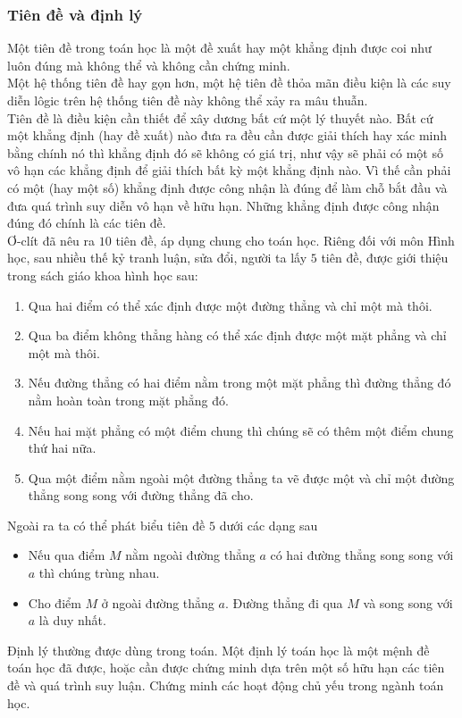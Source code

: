 \subsubsection{Tiên đề và định lý}
Một tiên đề trong toán học là một đề xuất hay một khẳng  định được coi như luôn đúng mà không thể  và không cần chứng minh.\\
Một hệ thống tiên đề hay gọn hơn, một hệ tiên đề thỏa mãn điều kiện là các suy diễn lôgic trên hệ thống tiên đề này không thể xảy ra mâu thuẫn.\\
Tiên đề là điều kiện cần thiết để xây dương bất cứ một lý thuyết nào. Bất cứ một khẳng định (hay đề xuất) nào đưa ra  đều cần được giải thích hay xác minh bằng chính nó thì khẳng định đó sẽ không có giá trị, như vậy sẽ phải có một số vô hạn các khẳng định để giải thích bất kỳ một khẳng định nào. Vì thế  cần phải có một (hay một số) khẳng định được công nhận là đúng để làm chỗ bắt đầu  và đưa quá trình suy diễn vô hạn về hữu hạn. Những khẳng định được công nhận đúng đó chính là các tiên đề.\\
Ơ-clít đã nêu ra $10$ tiên đề, áp dụng chung cho toán học. Riêng đối với môn Hình học, sau nhiều thế kỷ tranh luận, sửa đổi, người ta lấy $5$ tiên đề, được giới thiệu trong sách giáo khoa hình học sau:
	\begin{enumerate}[1.]
	\item Qua hai điểm có thể xác định được một đường thẳng và chỉ một mà thôi.
	\item Qua ba điểm không thẳng hàng có thể xác định được một mặt phẳng và chỉ một mà thôi.
	\item Nếu  đường thẳng có hai điểm nằm trong một mặt phẳng thì đường thẳng đó nằm hoàn toàn trong mặt phẳng đó.
	\item Nếu hai mặt phẳng có một điểm chung thì chúng sẽ có thêm một điểm chung thứ hai nữa.
	\item Qua một điểm nằm ngoài một đường thẳng ta vẽ  được một và chỉ một đường thẳng song song với đường thẳng đã cho.
\end{enumerate}
Ngoài ra ta có thể phát biểu tiên đề $5$ dưới các dạng sau
	\begin{itemize}
	\item  Nếu qua điểm $M$ nằm ngoài đường thẳng $a$ có hai đường thẳng song song với $a$ thì chúng trùng nhau.
	\item  Cho điểm $M$ ở ngoài đường thẳng $a$. Đường thẳng đi qua $M$ và song song với $a$ là duy nhất.
\end{itemize}
Định lý thường được dùng trong toán. Một định lý toán học là một mệnh đề toán học đã được, hoặc cần được chứng minh dựa trên một số hữu hạn các tiên đề và quá trình suy luận. Chứng minh các hoạt động chủ yếu trong ngành toán học.
